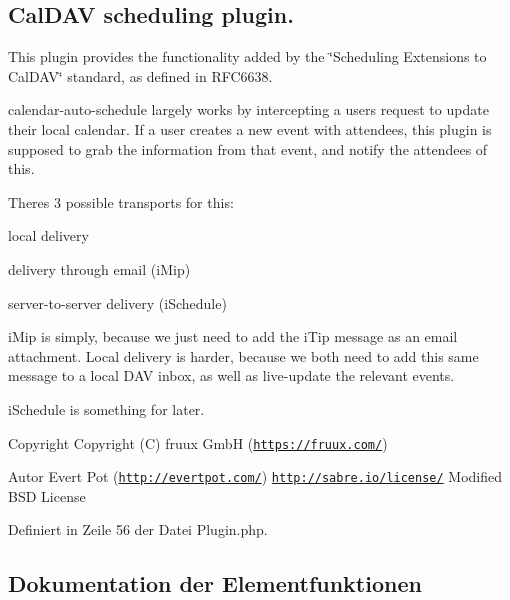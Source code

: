 \subsection*{Cal\+D\+AV scheduling plugin. }

This plugin provides the functionality added by the \char`\"{}\+Scheduling Extensions
to Cal\+D\+A\+V\char`\"{} standard, as defined in R\+F\+C6638.

calendar-\/auto-\/schedule largely works by intercepting a users request to update their local calendar. If a user creates a new event with attendees, this plugin is supposed to grab the information from that event, and notify the attendees of this.

There\textquotesingle{}s 3 possible transports for this\+:
\begin{DoxyItemize}
\item local delivery
\item delivery through email (i\+Mip)
\item server-\/to-\/server delivery (i\+Schedule)
\end{DoxyItemize}

i\+Mip is simply, because we just need to add the i\+Tip message as an email attachment. Local delivery is harder, because we both need to add this same message to a local D\+AV inbox, as well as live-\/update the relevant events.

i\+Schedule is something for later.

\begin{DoxyCopyright}{Copyright}
Copyright (C) fruux GmbH (\href{https://fruux.com/}{\tt https\+://fruux.\+com/}) 
\end{DoxyCopyright}
\begin{DoxyAuthor}{Autor}
Evert Pot (\href{http://evertpot.com/}{\tt http\+://evertpot.\+com/})  \href{http://sabre.io/license/}{\tt http\+://sabre.\+io/license/} Modified B\+SD License 
\end{DoxyAuthor}


Definiert in Zeile 56 der Datei Plugin.\+php.



\subsection{Dokumentation der Elementfunktionen}
\mbox{\label{class_sabre_1_1_cal_d_a_v_1_1_schedule_1_1_plugin_a2d167261595f6f62b5a18e101add2864}} 
